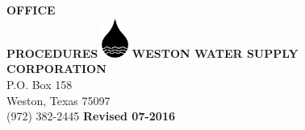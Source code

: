 \documentclass{article}
\begin{document}
\begin{titlepage}
\begin{center}
\uppercase{\fontsize{1.5cm}{2.5cm}\selectfont\textbf{Office\\Procedures}}
\vfill
\includegraphics[height=1.3cm]{logo}
\uppercase{\huge\textbf{Weston Water Supply\\Corporation}}
\\
{\huge P.O. Box 158\\Weston, Texas 75097\\(972) 382-2445}
\vfill
{\huge\textbf{Revised 07-2016}}
\end{center}
\end{titlepage}


%
%
%
%
%
%
%
%
\end{document}
